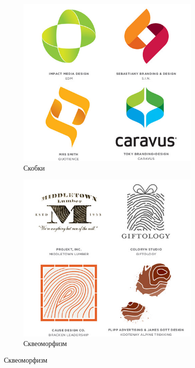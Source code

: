 \begin{figure}[h!]
  \ContinuedFloat
  \centering
  \begin{subfigure}{.45\textwidth}
    \centering
    \includegraphics[width=\linewidth]{images/supplement/logolounge/2013/Skobki}
    \caption{Скобки}
    \label{fig:logolounge:2013:skobki}
  \end{subfigure}
  \hfill
  \centering
  \begin{subfigure}{.45\textwidth}
    \centering
    \includegraphics[width=\linewidth]{images/supplement/logolounge/2013/Skveomorfism}
    \caption{Сквеоморфизм}
    \label{fig:logolounge:2013:skveomorfism}
  \end{subfigure}


\end{figure}
